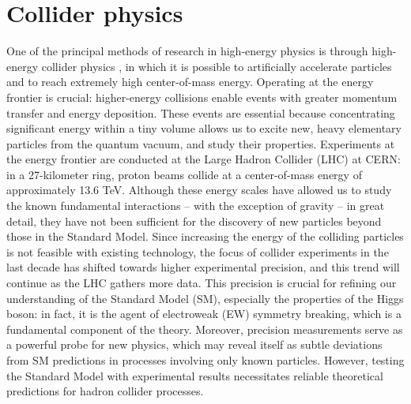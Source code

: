 \documentclass[a4paper, 12pt]{book}
\begin{document}
\section{Collider physics}
One of the principal methods of research in high-energy physics is through high-energy collider physics \cite{ellis}, in which it is possible to artificially accelerate particles and to reach extremely high center-of-mass energy. Operating at the energy frontier is crucial: higher-energy collisions enable events with greater momentum transfer and energy deposition. These events are essential because concentrating significant energy within a tiny volume allows us to excite new, heavy elementary particles from the quantum vacuum, and study their properties. Experiments at the energy frontier are conducted at the Large Hadron Collider (LHC) at CERN: in a 27-kilometer ring, proton beams collide at a center-of-mass energy of approximately 13.6 TeV. Although these energy scales have allowed us to study the known fundamental interactions – with the exception of gravity – in great detail, they have not been sufficient for the discovery of new particles beyond those in the Standard Model.  Since increasing the energy of the colliding particles is not feasible with existing technology, the focus of collider experiments in the last decade has shifted towards higher experimental precision, and this trend will continue as the LHC gathers more data. This precision is crucial for refining our understanding of the Standard Model (SM), especially the properties of the Higgs boson: in fact, it is the agent of electroweak (EW) symmetry breaking, which is a fundamental component of the theory. Moreover, precision measurements serve as a powerful probe for new physics, which may reveal itself as subtle deviations from SM predictions in processes involving only known particles.  However, testing the Standard Model with experimental results necessitates reliable theoretical predictions for hadron collider processes.
\end{document}
